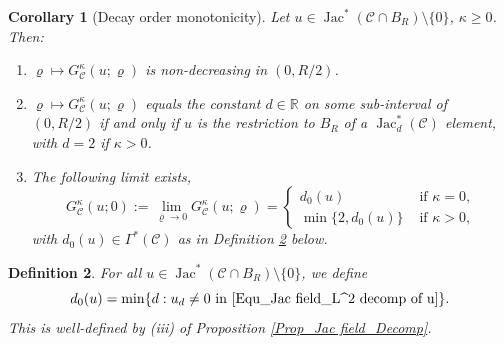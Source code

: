 \documentclass[11pt, letterpaper, reqno]{amsart}
\numberwithin{equation}{section}
\newtheorem{Def}{Definition}[section]
\newtheorem{Cor}[Def]{Corollary}
\theoremstyle{remark}
\newcommand{\RR}{\mathbb{R}}
\newcommand{\cC}{\mathcal{C}}
\newcommand{\Jac}{\operatorname{Jac}}
\begin{document}
\begin{Cor}[Decay order monotonicity] \label{Cor_Jac field_Freq Monoton}
	Let $u \in \Jac^*(\cC \cap B_R) \setminus \{0\}$, $\kappa \geq 0$. Then:
	\begin{enumerate}
		\item[(i)] $\varrho \mapsto G^\kappa_\cC(u; \varrho)$ is non-decreasing in $(0, R/2)$. 
		\item[(ii)] $\varrho \mapsto G^\kappa_\cC(u; \varrho)$ equals the constant $d \in \RR$ on some sub-interval of $(0, R/2)$ if and only if $u$ is the restriction to $B_R$ of a $\Jac^*_d(\cC)$ element, with $d = 2$ if $\kappa > 0$.
		\item[(iii)] The following limit exists, 
		\[
			G^\kappa_\cC(u; 0):= \lim_{\varrho \to 0} G^\kappa_\cC(u; \varrho) = \begin{cases}
				d_0(u)  & \text{ if } \kappa = 0, \\
				\min\{2,d_0(u)\} & \text{ if } \kappa > 0 ,
        \end{cases}
      \] 
		with $d_0(u) \in \Gamma^*(\cC)$ as in Definition \ref{defi:d.0.u} below.
	\end{enumerate}
\end{Cor}
     
 \begin{Def} \label{defi:d.0.u}
 	For all $u \in \Jac^*(\cC \cap B_R) \setminus \{0\}$, we define
	\[ d_0(u) = \min \{ d : u_d \neq 0 \text{ in \eqref{Equ_Jac field_L^2 decomp of u}} \}. \]
	This is well-defined by {(iii)} of Proposition \ref{Prop_Jac field_Decomp}.
 \end{Def}
\end{document}
